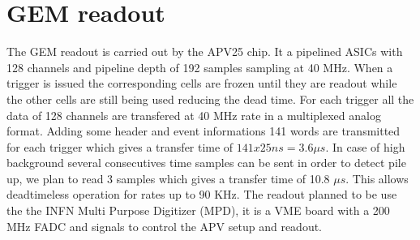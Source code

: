 \documentclass{article}
\begin{document}
\section{GEM readout}
The GEM readout is carried out by the APV25 chip. It a pipelined ASICs with 128 channels and pipeline depth of 192 samples sampling at 40 MHz. When a trigger is issued the corresponding cells are frozen until they are readout while the other cells are still being used reducing the dead time.
For each trigger all the data of 128 channels are transfered at 40 MHz rate in a multiplexed analog format. Adding some header and event informations 141 words are transmitted for each trigger which gives a transfer time of $141x25 ns = 3.6 \mu s $. In case of high background several consecutives time samples can be sent in order to detect pile up, we plan to read 3 samples which gives a transfer time of 10.8 $\mu s$. This allows deadtimeless operation for rates up to 90 KHz. The readout planned to be use the the INFN Multi Purpose Digitizer (MPD), it is a VME board with a 200 MHz FADC and signals to control the APV setup and readout. 
\end{document}
